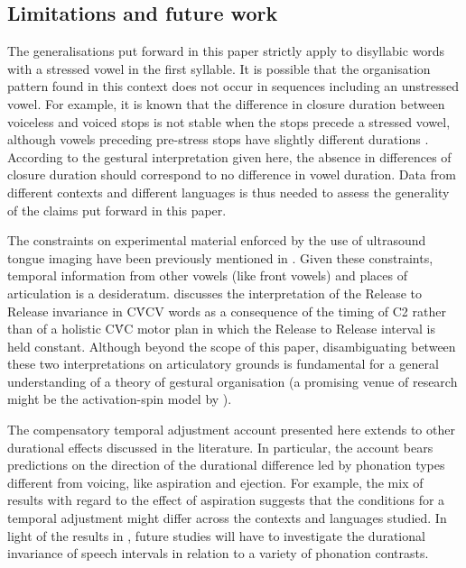 \documentclass[preprint]{JASAnew}
\begin{document}
\hypertarget{limitations-and-future-work}{%
\subsection{Limitations and future
work}\label{limitations-and-future-work}}

The generalisations put forward in this paper strictly apply to
disyllabic words with a stressed vowel in the first syllable. It is
possible that the organisation pattern found in this context does not
occur in sequences including an unstressed vowel. For example, it is
known that the difference in closure duration between voiceless and
voiced stops is not stable when the stops precede a stressed vowel,
although vowels preceding pre-stress stops have slightly different
durations \citep{davis1989}. According to the gestural interpretation
given here, the absence in differences of closure duration should
correspond to no difference in vowel duration. Data from different
contexts and different languages is thus needed to assess the generality
of the claims put forward in this paper.

The constraints on experimental material enforced by the use of
ultrasound tongue imaging have been previously mentioned in
. Given these constraints, temporal information from
other vowels (like front vowels) and places of articulation is a
desideratum.  discusses the interpretation of the
Release to Release invariance in CV́CV words as a consequence of the
timing of C2 rather than of a holistic CV́C motor plan in which the
Release to Release interval is held constant. Although beyond the scope
of this paper, disambiguating between these two interpretations on
articulatory grounds is fundamental for a general understanding of a
theory of gestural organisation (a promising venue of research might be
the activation-spin model by \citealt{tilsen2013}).

The compensatory temporal adjustment account presented here extends to
other durational effects discussed in the literature. In particular, the
account bears predictions on the direction of the durational difference
led by phonation types different from voicing, like aspiration and
ejection. For example, the mix of results with regard to the effect of
aspiration \citep{durvasula2012} suggests that the conditions for a
temporal adjustment might differ across the contexts and languages
studied. In light of the results in \citet{begus2017}, future studies
will have to investigate the durational invariance of speech intervals
in relation to a variety of phonation contrasts.
\end{document}
